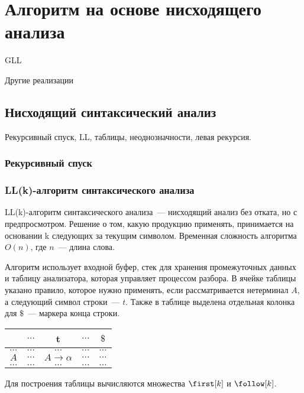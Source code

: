 \section{Алгоритм на основе нисходящего анализа}

GLL~\cite{Grigorev:2017:CPQ:3166094.3166104}

Другие реализации~\cite{MEDEIROS201975}

\subsection{Нисходящий синтаксический анализ}

Рекурсивный спуск, LL, таблицы, неоднозначности, левая рекурсия.

\subsubsection{Рекурсивный спуск}

\subsubsection{LL(k)-алгоритм синтаксического анализа}

LL(k)-алгоритм синтаксического анализа~--- нисходящий анализ без отката, но с предпросмотром. 
Решение о том, какую продукцию применять, принимается на основании k следующих за текущим символом. 
Временная сложность алгоритма $O(n)$, где $n$~--- длина слова. 

Алгоритм использует входной буфер, стек для хранения промежуточных данных и таблицу анализатора, которая управляет процессом разбора. 
В ячейке таблицы указано правило, которое нужно применять, если рассматривается нетерминал $A$, а следующий символ строки~--- $t$. 
Также в таблице выделена отдельная колонка для $\$$~--- маркера конца строки. 

\begin{center}
  \begin{tabular}{ c || c | c | c | c }
             & $\dots$ & t & $\dots$ & $\$$ \\ \hline  
    $\dots$  & $\dots$ & $\dots$ & $\dots$ & $\dots$ \\ \hline  
    $A$  & $\dots$ & $A \to \alpha$ & $\dots$ & $\dots$ \\ \hline  
    $\dots$  & $\dots$ & $\dots$ & $\dots$ & $\dots$ 
  \end{tabular}  
\end{center}

Для построения таблицы вычисляются множества $\first[k]$ и $\follow[k]$.

